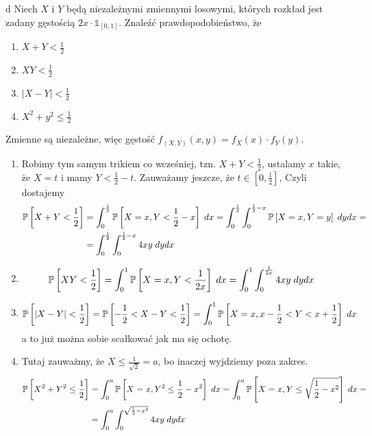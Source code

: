 \documentclass{article}
\begin{document}
\begin{problem}[3]{d}
Niech $X$ i $Y$ będą niezależnymi zmiennymi losowymi, których rozkład jest zadany gęstością $2x\cdot\mathds{1}_[0,1]$. Znaleźć prawdopodobieństwo, że
\begin{enumerate}[label=(\alph*)]
    \item $X+Y<\frac{1}{2}$
    \item $XY<\frac{1}{2}$
    \item $|X-Y|<\frac{1}{2}$
    \item $X^2+y^2\leq\frac{1}{2}$
\end{enumerate}
\end{problem}

Zmienne są niezależne, więc gęstość $f_{(X, Y)}(x, y)=f_X(x)\cdot f_Y(y)$.

\begin{enumerate}[label=(\alph*), leftmargin=*]
    \item Robimy tym samym trikiem co wcześniej, tzn. $X+Y<\frac{1}{2}$, ustalamy $x$ takie, że $X=t$ i mamy $Y<\frac{1}{2}-t$. Zauważamy jeszcze, że $t\in[0,\frac{1}{2}]$, Czyli dostajemy
    \begin{align*}
        \prob{X+Y<\frac{1}{2}}&=\int_0^\frac{1}{2}\prob{X=x, Y<\frac{1}{2}-x}\;dx=\int_0^\frac{1}{2}\int_0^{\frac{1}{2}-x}\prob{X=x, Y=y}\;dydx=\\
        &=\int_0^\frac{1}{2}\int_0^{\frac{1}{2}-x}4xy\;dydx
    \end{align*}
    \item \begin{align*}
        \prob{XY<\frac{1}{2}}&=\int_0^1\prob{X=x, Y<\frac{1}{2x}}\;dx=\int_0^1\int_0^{\frac{1}{2x}}4xy\;dydx
    \end{align*}
    \item \begin{align*}
        \prob{|X-Y|<\frac{1}{2}}&=\prob{-\frac{1}{2}<X-Y<\frac{1}{2}}=\int_0^1\prob{X=x,x-\frac{1}{2}<Y<x+\frac{1}{2}}\;dx
    \end{align*}
    a to już można sobie scałkować jak ma się ochotę.
    \item Tutaj zauważmy, że $X\leq\frac{1}{\sqrt{2}}=a$, bo inaczej wyjdziemy poza zakres. 
    \begin{align*}
        \prob{X^2+Y^2\leq \frac{1}{2}}&=\int_0^a\prob{X=x, Y^2\leq \frac{1}{2}-x^2}\;dx=\int_0^a\prob{X=x, Y\leq\sqrt{\frac{1}{2}-x^2}}\;dx=\\
        &=\int_0^a\int_0^{\sqrt{\frac{1}{2}-x^2}}4xy\;dydx
    \end{align*}
\end{enumerate}
\end{document}
